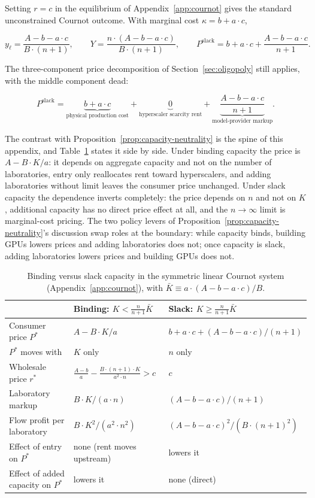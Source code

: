 \documentclass[11pt]{article}
\begin{document}
Setting $r=c$ in the equilibrium of Appendix~\ref{app:cournot} gives the standard unconstrained Cournot outcome. With marginal cost $\kappa=b+a\cdot c$,

\begin{equation}y_\ell=\frac{A-b-a\cdot c}{B\cdot(n+1)},\qquad Y=\frac{n\cdot(A-b-a\cdot c)}{B\cdot(n+1)},\qquad P^{\mathrm{slack}}=b+a\cdot c+\frac{A-b-a\cdot c}{n+1}.\end{equation}

The three-component price decomposition of Section~\ref{sec:oligopoly} still applies, with the middle component dead:

\begin{equation}P^{\mathrm{slack}}=\underbrace{b+a\cdot c}_{\text{physical production cost}}+\underbrace{0}_{\text{hyperscaler scarcity rent}}+\underbrace{\frac{A-b-a\cdot c}{n+1}}_{\text{model-provider markup}}.\end{equation}

The contrast with Proposition~\ref{prop:capacity-neutrality} is the spine of this appendix, and Table~\ref{tab:regime-contrast} states it side by side. Under binding capacity the price is $A-B\cdot K/a$: it depends on aggregate capacity and not on the number of laboratories, entry only reallocates rent toward hyperscalers, and adding laboratories without limit leaves the consumer price unchanged. Under slack capacity the dependence inverts completely: the price depends on $n$ and not on $K$, additional capacity has no direct price effect at all, and the $n\to\infty$ limit is marginal-cost pricing. The two policy levers of Proposition~\ref{prop:capacity-neutrality}'s discussion swap roles at the boundary: while capacity binds, building GPUs lowers prices and adding laboratories does not; once capacity is slack, adding laboratories lowers prices and building GPUs does not.

\begin{table}[htbp]
\centering
\caption{Binding versus slack capacity in the symmetric linear Cournot system (Appendix~\ref{app:cournot}), with $\bar K\equiv a\cdot(A-b-a\cdot c)/B$.}
\label{tab:regime-contrast}
\begin{tabular}{lll}
\hline
 & Binding: $K<\frac{n}{n+1}\bar K$ & Slack: $K\geq\frac{n}{n+1}\bar K$ \\
\hline
Consumer price $P^*$ & $A-B\cdot K/a$ & $b+a\cdot c+(A-b-a\cdot c)/(n+1)$ \\
$P^*$ moves with & $K$ only & $n$ only \\
Wholesale price $r^*$ & $\frac{A-b}{a}-\frac{B\cdot(n+1)\cdot K}{a^{2}\cdot n}>c$ & $c$ \\
Laboratory markup & $B\cdot K/(a\cdot n)$ & $(A-b-a\cdot c)/(n+1)$ \\
Flow profit per laboratory & $B\cdot K^{2}/(a^{2}\cdot n^{2})$ & $(A-b-a\cdot c)^{2}/(B\cdot(n+1)^{2})$ \\
Effect of entry on $P^*$ & none (rent moves upstream) & lowers it \\
Effect of added capacity on $P^*$ & lowers it & none (direct) \\
\hline
\end{tabular}
\end{table}
\end{document}
